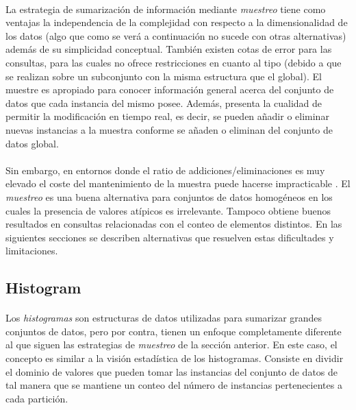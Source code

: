 \documentclass{subfiles}
\begin{document}
        \paragraph{}
        La estrategia de sumarización de información mediante \emph{muestreo} tiene como ventajas la independencia de la complejidad con respecto a la dimensionalidad de los datos (algo que como se verá a continuación no sucede con otras alternativas) además de su simplicidad conceptual. También existen cotas de error para las consultas, para las cuales no ofrece restricciones en cuanto al tipo (debido a que se realizan sobre un subconjunto con la misma estructura que el global). El muestre es apropiado para conocer información general acerca del conjunto de datos que cada instancia del mismo posee. Además, presenta la cualidad de permitir la modificación en tiempo real, es decir, se pueden añadir o eliminar nuevas instancias a la muestra conforme se añaden o eliminan del conjunto de datos global.

        \paragraph{}
        Sin embargo, en entornos donde el ratio de addiciones/eliminaciones es muy elevado el coste del mantenimiento de la muestra puede hacerse impracticable . El \emph{muestreo} es una buena alternativa para conjuntos de datos homogéneos en los cuales la presencia de valores atípicos es irrelevante. Tampoco obtiene buenos resultados en consultas relacionadas con el conteo de elementos distintos. En las siguientes secciones se describen alternativas que resuelven estas dificultades y limitaciones.

      \subsection{Histogram}
      \label{sec:histogram}

        \paragraph{}
        Los \emph{histogramas} son estructuras de datos utilizadas para sumarizar grandes conjuntos de datos, pero por contra, tienen un enfoque completamente diferente al que siguen las estrategias de \emph{muestreo} de la sección anterior. En este caso, el concepto es similar a la visión estadística de los histogramas. Consiste en dividir el dominio de valores que pueden tomar las instancias del conjunto de datos de tal manera que se mantiene un conteo del número de instancias pertenecientes a cada partición.
\end{document}
